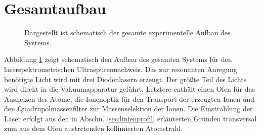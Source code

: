 \section{Gesamtaufbau}\label{sec:gesamtaufbau}
\begin{figure}[h]
 	\centering
	\caption[Gesamter experimenteller Aufbau, schematisch]{Dargestellt ist
	schematisch der gesamte experimentelle Aufbau des
	Systems.}\label{fig:experimenteller_aufbau_gesamt}
\end{figure}
Abbildung \ref{fig:experimenteller_aufbau_gesamt} zeigt schematisch den
Aufbau des gesamten Systems für den laserspektrometrischen Ultraspurennachweis.
Das zur resonanten Anregung benötigte Licht wird mit drei Diodenlasern erzeugt. Der größte Teil des Lichts wird
direkt in die Vakuumapparatur geführt. Letztere enthält einen Ofen für das
Ausheizen der Atome, die Ionenoptik für den Transport der erzeugten Ionen und
den Quadrupolmassenfilter zur Massenselektion der Ionen.
Die Einstrahlung der Laser erfolgt aus den in Abschn. \ref{sec:linienprofil}
erläuterten Gründen transversal zum aus dem Ofen austretenden kollimierten Atomstrahl.

